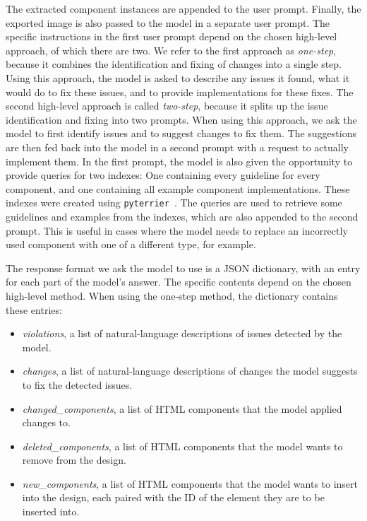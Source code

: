 \documentclass[11pt,titlepage,oneside,openany]{book}
\begin{document}
The extracted component instances are appended to the user prompt. Finally, the exported image is also passed to the model in a separate user prompt. The specific instructions in the first user prompt depend on the chosen high-level approach, of which there are two. We refer to the first approach as \emph{one-step}, because it combines the identification and fixing of changes into a single step. Using this approach, the model is asked to describe any issues it found, what it would do to fix these issues, and to provide implementations for these fixes. The second high-level approach is called \emph{two-step}, because it splits up the issue identification and fixing into two prompts. When using this approach, we ask the model to first identify issues and to suggest changes to fix them. The suggestions are then fed back into the model in a second prompt with a request to actually implement them. In the first prompt, the model is also given the opportunity to provide queries for two indexes: One containing every guideline for every component, and one containing all example component implementations. These indexes were created using \texttt{pyterrier}~\cite{pyterrier2020ictir}. The queries are used to retrieve some guidelines and examples from the indexes, which are also appended to the second prompt. This is useful in cases where the model needs to replace an incorrectly used component with one of a different type, for example. 

The response format we ask the model to use is a JSON dictionary, with an entry for each part of the model's answer. The specific contents depend on the chosen high-level method. When using the one-step method, the dictionary contains these entries:
\begin{itemize}
	\item \emph{violations}, a list of natural-language descriptions of issues detected by the model.
	\item \emph{changes}, a list of natural-language descriptions of changes the model suggests to fix the detected issues.
	\item \emph{changed\_components}, a list of HTML components that the model applied changes to.
	\item \emph{deleted\_components}, a list of HTML components that the model wants to remove from the design.
	\item \emph{new\_components}, a list of HTML components that the model wants to insert into the design, each paired with the ID of the element they are to be inserted into.
\end{itemize}
\end{document}
